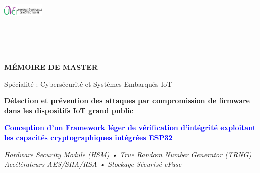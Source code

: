 
\begin{titlepage}
    \centering
    \vspace*{0.5cm}
    
    \includegraphics[width=0.15\textwidth]{assets/figures/university_logo.png}
    
    \vspace{0.5cm}
    
    {\large \universite}\\
    {\large \faculte}\\
    {\large \departement}\\
    
    \vspace{1.5cm}
    
    {\LARGE \textbf{MÉMOIRE DE MASTER}}\\
    
    \vspace{0.8cm}
    
    {\Large Spécialité : Cybersécurité et Systèmes Embarqués IoT}\\
    
    \vspace{1.5cm}
    
    {\LARGE \textbf{Détection et prévention des attaques par compromission de firmware dans les dispositifs IoT grand public}}\\
    
    \vspace{1cm}
    
    {\Large \textcolor{blue}{\textbf{Conception d'un Framework léger de vérification d'intégrité exploitant les capacités cryptographiques intégrées ESP32}}}\\
    
    \vspace{0.8cm}
    
    {\large \textit{Hardware Security Module (HSM) • True Random Number Generator (TRNG)}}\\
    {\large \textit{Accélérateurs AES/SHA/RSA • Stockage Sécurisé eFuse}}\\
    

\end{titlepage}
